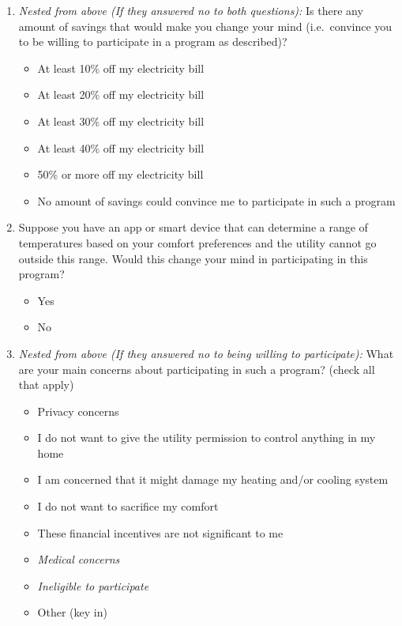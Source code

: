 \documentclass{article}
\begin{document}
\begin{enumerate}
\item \textit{Nested from above (If they answered no to both questions):}
Is there any amount of savings that would make you change your mind (i.e.\ convince you to be willing to participate in a program as described)?
\begin{itemize}
  \item[\checkbox] At least 10\% off my electricity bill
  \item[\checkbox] At least 20\% off my electricity bill
  \item[\checkbox] At least 30\% off my electricity bill
  \item[\checkbox] At least 40\% off my electricity bill
  \item[\checkbox] 50\% or more off my electricity bill
  \item[\checkbox] No amount of savings could convince me to participate in such a program
\end{itemize}
 

\item Suppose you have an app or smart device that can determine a range of temperatures based on your comfort preferences and the utility cannot go outside this range. Would this change your mind in participating in this program?
\begin{itemize}
  \item[\checkbox] Yes
  \item[\checkbox] No
\end{itemize}
 

\item \textit{Nested from above (If they answered no to being willing to participate):}
What are your main concerns about participating in such a program? (check all that apply)
\begin{itemize}
  \item[\checkbox] Privacy concerns
  \item[\checkbox] I do not want to give the utility permission to control anything in my home
  \item[\checkbox] I am concerned that it might damage my heating and/or cooling system
  \item[\checkbox] I do not want to sacrifice my comfort
  \item[\checkbox] These financial incentives are not significant to me
  \item[\checkbox] \textit{Medical concerns}
  \item[\checkbox] \textit{Ineligible to participate}
  \item[\checkbox] Other (key in)
\end{itemize}
 


\end{enumerate}
\end{document}
